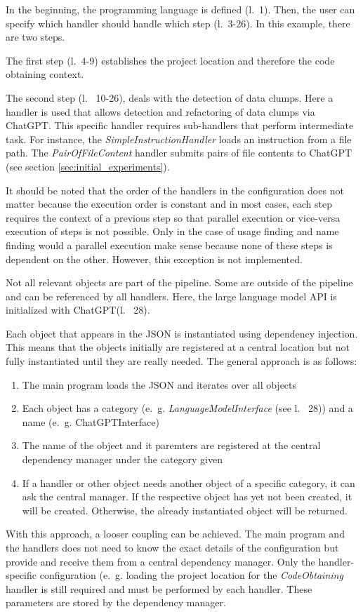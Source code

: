 In the beginning, the programming language is defined (l.~1). Then, the user can specify which handler should handle which step (l.~3-26). In this example, there are two steps. 

The first step (l.~4-9) establishes the project location and therefore the code obtaining context.

The second step (l.~ 10-26), deals with the detection of data clumps. Here a handler is used that allows detection and refactoring of data clumps via ChatGPT. This specific handler requires sub-handlers that perform intermediate task. For instance, the \textit{SimpleInstructionHandler} loads an instruction from a file path. The \textit{PairOfFileContent} handler submits pairs of file contents to ChatGPT (see section \ref{sec:initial_experiments}).

It should be noted that the order of the handlers in the configuration  does not matter because the execution order is constant and in most cases, each step requires the context of a previous step so that parallel execution or vice-versa execution of steps is not possible. Only in the case of usage finding and name finding would a parallel execution make sense because none of these steps is dependent on the other.  However, this exception is not implemented.

Not all relevant objects are part of the pipeline. Some are outside of the pipeline and can be referenced by all handlers. Here, the large language model \ac{API} is initialized with ChatGPT(l.~ 28).

Each object that appears in the \ac{JSON} is instantiated using dependency injection. This means that the objects initially are registered at a central location but not fully instantiated until they are really needed. The general approach is as follows:
\begin{enumerate}
    \item The main program loads the \ac{JSON} and iterates over all objects
    \item Each object has a category (e.~g. \textit{LanguageModelInterface} (see l.~ 28)) and a name (e.~g. ChatGPTInterface) 
    \item The name of the object and it paremters are registered at the central dependency manager under the category given
    \item If a handler or other object needs another object of a specific category, it can ask the central manager. If the respective object has  yet not been created, it will be created. Otherwise, the already instantiated object will be returned. 
\end{enumerate}
With this approach, a looser coupling can be achieved. The main program and the handlers does not need to know the exact details of the configuration but provide and receive them from a central dependency manager. Only the handler-specific configuration (e.~g. loading the project location  for the \textit{CodeObtaining} handler is still required and must be performed by each handler. These parameters are stored by the dependency manager. 
